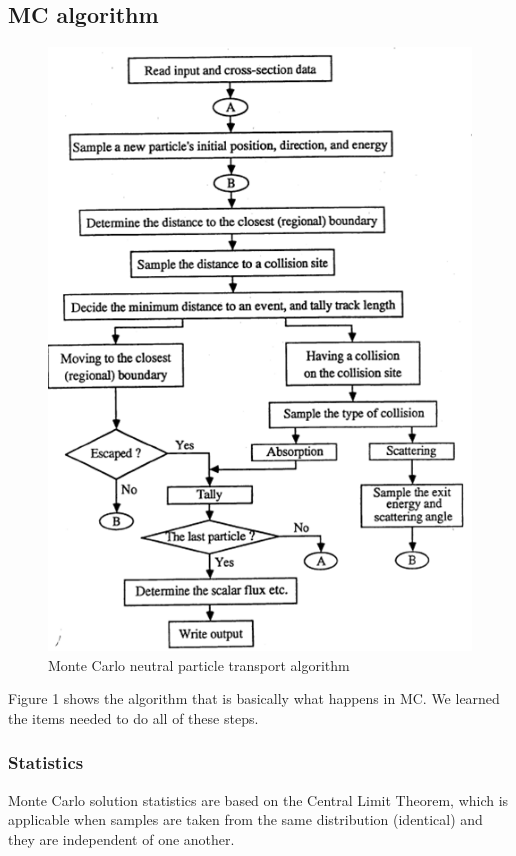 \documentclass[12pt]{article}
\begin{document}
\subsection*{MC algorithm}
\begin{figure}[h]
\begin{center}
  \includegraphics[height=6 in,clip]{monte-carlo/MC-algorithm}
  \caption{Monte Carlo neutral particle transport algorithm}
  \end{center}
  \label{fig:mc-algo}
\end{figure}

Figure 1 shows the algorithm that is basically what happens in MC. We learned the items needed to do all of these steps.

\subsubsection*{Statistics}

Monte Carlo solution statistics are based on the Central Limit Theorem, which is applicable when samples are taken from the same distribution (identical) and they are independent of one another. 
\end{document}
